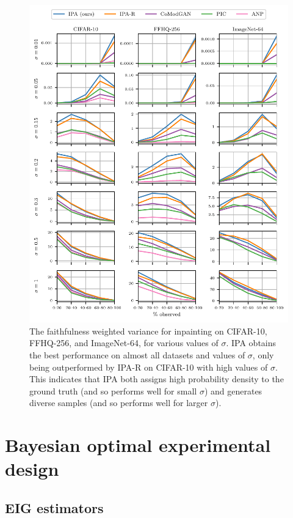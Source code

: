 \begin{figure}
  \includegraphics[scale=1]{figs/cigcvae/fwv_sigma}
  \caption{The faithfulness weighted variance for inpainting on CIFAR-10,
    FFHQ-256, and ImageNet-64, for various values of $\sigma$. IPA obtains the
    best performance on almost all datasets and values of $\sigma$, only being
    outperformed by IPA-R on CIFAR-10 with high values of $\sigma$. This
    indicates that IPA both assigns high probability density to the ground truth
    (and so performs well for small $\sigma$) and generates diverse samples (and
    so performs well for larger $\sigma$).}
  \label{fig:cigcvae-fwv}
\end{figure}



\section{Bayesian optimal experimental design} \label{sec:cigcvae-supp-boed}

\subsection{EIG estimators}  \label{sec:cigcvae-eig-estimator}

